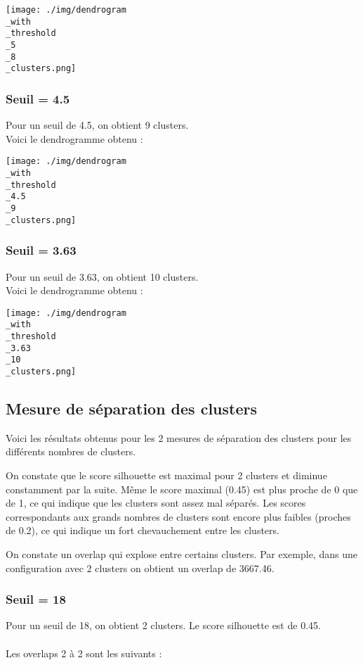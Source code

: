 \documentclass{article}
\begin{document}
\begin{center}
    \texttt{[image: ./img/dendrogram\\\_with\\\_threshold\\\_5\\\_8\\\_clusters.png]}
\end{center}

\subsubsection*{Seuil = 4.5}
Pour un seuil de 4.5, on obtient 9 clusters.\\
Voici le dendrogramme obtenu :

\begin{center}
    \texttt{[image: ./img/dendrogram\\\_with\\\_threshold\\\_4.5\\\_9\\\_clusters.png]}
\end{center}

\subsubsection*{Seuil = 3.63}
Pour un seuil de 3.63, on obtient 10 clusters.\\
Voici le dendrogramme obtenu :

\begin{center}
    \texttt{[image: ./img/dendrogram\\\_with\\\_threshold\\\_3.63\\\_10\\\_clusters.png]}
\end{center}


\subsection*{Mesure de séparation des clusters}
Voici les résultats obtenus pour les 2 mesures de séparation des clusters
pour les différents nombres de clusters.

On constate que le score silhouette est maximal pour 2 clusters et
diminue constamment par la suite. Même le score maximal (0.45) 
est plus proche de 0 que de 1,
ce qui indique que les clusters sont assez mal séparés. Les scores
correspondants aux grands nombres de clusters sont encore plus faibles
(proches de 0.2), ce qui indique un fort chevauchement entre les clusters.

On constate un overlap qui explose entre certains clusters. Par exemple,
dans une configuration avec 2 clusters on obtient un overlap de 3667.46.
\subsubsection*{Seuil = 18}
Pour un seuil de 18, on obtient 2 clusters. Le score silhouette est de 0.45.\\\\
Les overlaps 2 à 2 sont les suivants :\\
\end{document}
